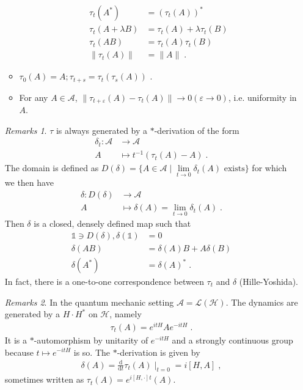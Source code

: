 \documentclass[
a4paper, %
11pt, %
onecolumn, %
openany, %
]{memoir}
\theoremstyle{definition}
\theoremstyle{remark}
\newtheorem{remarks}{Remarks}[chapter]
\theoremstyle{plain}
\begin{document}
\begin{enumerate}
\begin{itemize}
\begin{align}
	\tau_t(A^*)&=(\tau_t(A))^*\\
	\tau_t(A+\lambda B)&=\tau_t(A)+\lambda\tau_t(B)\\
	\tau_t(AB)&=\tau_t(A)\tau_t(B)\\
	\|\tau_t(A)\|&=\|A\|\; .
	\end{align}
	\item $\tau_0(A)=A; \tau_{t+s}=\tau_t(\tau_s(A))$ \; .
	\item For any $A\in \mathcal{A}$, $\| \tau_{t+\varepsilon}(A)-\tau_{t}(A)\|\rightarrow 0 (\varepsilon \rightarrow 0)$, i.e. uniformity in $A$.
\end{itemize}
\begin{remarks}
	$\tau$ is always generated by a $*$-derivation of the form \begin{align}
	\delta_t:\mathcal{A}&\longrightarrow \mathcal{A}\\
	A&\longmapsto t^{-1}(\tau_t(A)-A)\; .
	\end{align}
	The domain is defined as $D(\delta)=\{A\in\mathcal{A} \mid \lim\limits_{t\rightarrow 0}\delta_t(A) \text{ exists}\}$ for which we then have \begin{align}
	\delta: D(\delta)&\longrightarrow \mathcal{A}\\
	A&\longmapsto \delta(A)=\lim_{t\rightarrow 0}\delta_t(A)\; .
	\end{align}
	Then $\delta$ is a closed, densely defined map such that \begin{align*}
	\mathds{1}\ni D(\delta), \delta(\mathds{1})&=0\\
							\delta(AB)&=\delta(A)B+A\delta(B)\\
							\delta(A^*)&=\delta(A)^*\;  .
	\end{align*}
	In fact, there is a one-to-one correspondence between $\tau_t$ and $\delta$ (Hille-Yoshida).
\end{remarks}
\begin{remarks}
	In the quantum mechanic setting $\mathcal{A}=\mathcal{L}(\mathcal{H})$. The dynamics are generated by a $H\cdot H^*$ on $\mathcal{H}$, namely \begin{align}
	\tau_t(A)=e^{itH}Ae^{-itH}\; .
	\end{align}
	It is a $*$-automorphism by unitarity of $e^{-itH}$ and a strongly continuous group because $t\mapsto e^{-itH}$ is so. The $*$-derivation is given by \begin{align*}
	\delta(A)=\frac{\mathrm{d}}{\mathrm{d}t}\tau_t(A)\mid_{t=0}=i[H,A]\; ,
	\end{align*}
	sometimes written as $\tau_t(A)=e^{i[H,\cdot]t}(A)$.

\end{remarks}
\end{enumerate}
\end{document}
